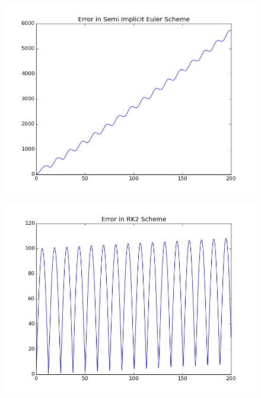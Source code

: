 \documentclass[11pt, a4paper]{article}
\begin{document}
\begin{figure}[H]
 \centering
 \includegraphics[width = \textwidth]{q1_error_euler2.png}
\end{figure}
\begin{figure}[H]
 \centering
 \includegraphics[width = \textwidth]{q1_error_RK2.png}
\end{figure}
\end{document}
